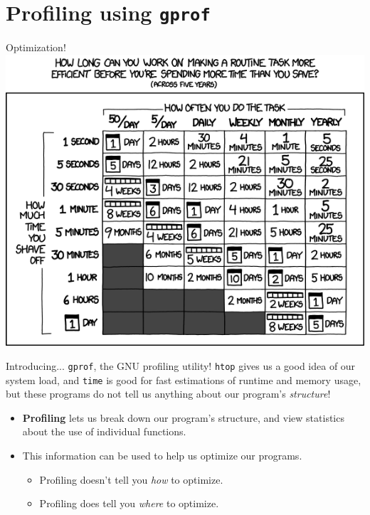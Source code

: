\documentclass[11pt]{beamer}
\begin{document}
\section[gprof]{Profiling using \texttt{gprof}}
\begin{frame}{Optimization!}
\center
\includegraphics[scale=0.4]{optimizing.png}
\end{frame}

\begin{frame}{Introducing... \texttt{gprof}, the GNU profiling utility!}
\texttt{htop} gives us a good idea of our system load, and \texttt{time} is good for fast estimations of runtime and memory usage, but these programs do not tell us anything about our program's \emph{structure}!
\begin{itemize}
\item \textbf{Profiling} lets us break down our program's structure, and view statistics about the use of individual functions.  
\item This information can be used to help us optimize our programs.
\begin{itemize}
\item Profiling doesn't tell you \emph{how} to optimize.
\item Profiling does tell you \emph{where} to optimize.
\end{itemize}
\end{itemize}
\end{frame}
\end{document}
